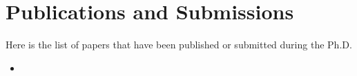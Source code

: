 

\chapter{Publications and Submissions}\label{app:publications}
Here is the list of papers that have been published or submitted during the Ph.D.

\begin{itemize}
	\item 
\end{itemize}
